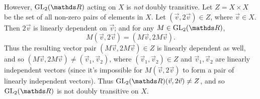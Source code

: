 \documentclass{homework}
\begin{document}
\begin{solution}
\begin{enumerate}[label=(\alph*)]
\begin{itemize}
          However, $\GL_{2}(\R)$ acting on $X$ is \textit{not} doubly transitive. Let $Z=X\times X$
          be the set of all non-zero pairs of elements in $X$. Let $(\vec{v},2\vec{v})\in Z$, where
          $\vec{v}\in X$. Then $2\vec{v}$ is linearly dependent on $\vec{v}$; and for any $M\in
          \GL_{2}(\R)$, \[
            M(\vec{v},2\vec{v})=(M\vec{v},2M\vec{v})
          .\] Thus the resulting vector pair $(M\vec{v},2M\vec{v})\in Z$ is linearly dependent as
          well, and so $(M\vec{v},2M\vec{v})\neq (\vec{v}_1,\vec{v}_2)$, where
          $(\vec{v}_1,\vec{v}_2)\in Z$ and $\vec{v}_1,\vec{v}_2$ are linearly independent vectors
          (since it's impossible for $M(\vec{v},2\vec{v})$ to form a pair of linearly independent
          vectors).  Thus $\GL_{2}(\R)(\vec{v},2\vec{v})\neq Z$, and so $\GL_{2}(\R)$ is not doubly
          transitive on $X$.
      \end{itemize}
  \end{enumerate}
\end{solution}
\end{document}
